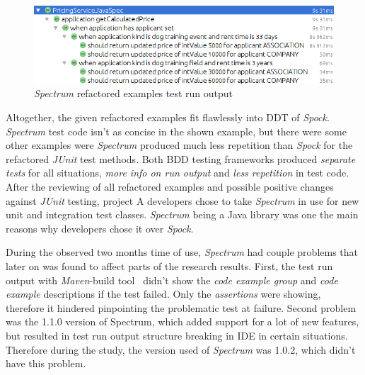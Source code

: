     \begin{figure}[H]
      \begin{center}
        \begin{topbot}[style=mdstyle]
        \includegraphics[width=\textwidth]{images/spectrum-pricing-results.png}
        \end{topbot}
        \caption{\textit{Spectrum} refactored examples test run output}
        \label{fig:spectrum-allu-refactor-output}
      \end{center}
    \end{figure}

    Altogether, the given refactored examples fit flawlessly into DDT of \textit{Spock}. \textit{Spectrum} test code isn't as concise in the shown example,
    but there were some other examples were \textit{Spectrum} produced much less repetition than \textit{Spock} for the refactored \textit{JUnit} test methods.
    Both BDD testing frameworks produced \textit{separate tests} for all situations, \textit{more info on run output} and \textit{less repetition} in test code.
    After the reviewing of all refactored examples and possible positive changes against \textit{JUnit} testing, project A developers chose to take
    \textit{Spectrum} in use for new unit and integration test classes. \textit{Spectrum} being a Java library was one the main reasons
    why developers chose it over \textit{Spock}.

    During the observed two months time of use, \textit{Spectrum} had couple problems that later on was found to affect parts of the research
    results. First, the test run output with \textit{Maven}-build tool~\cite{maven} didn't show the \textit{code example group} and \textit{code example}
    descriptions if the test failed. Only the \textit{assertions} were showing, therefore it hindered pinpointing the problematic test at failure.
    Second problem was the 1.1.0 version of Spectrum, which added support for a lot of new features, but resulted in test
    run output structure breaking in IDE in certain situations. Therefore during the study, the version used of \textit{Spectrum} was 1.0.2,
    which didn't have this problem.

